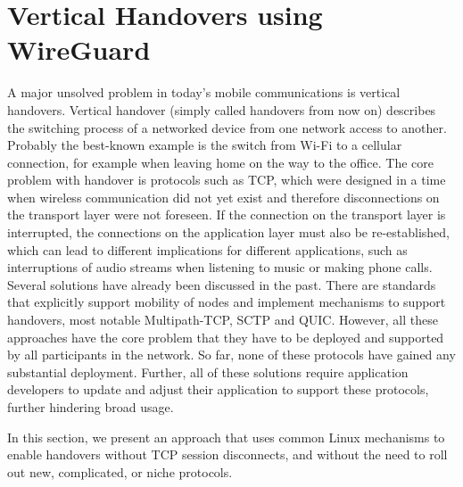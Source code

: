 \newcommand{\ld}{\texttt{LD\_PRELOAD}\xspace}

\section{Vertical Handovers using WireGuard}
\label{sec:wg:impl}

A major unsolved problem in today's mobile communications is vertical handovers.
Vertical handover (simply called handovers from now on) describes the switching process of a networked device from one network access to another.
Probably the best-known example is the switch from Wi-Fi to a cellular connection, for example when leaving home on the way to the office.
The core problem with handover is protocols such as TCP, which were designed in a time when wireless communication did not yet exist and therefore disconnections on the transport layer were not foreseen.
If the connection on the transport layer is interrupted, the connections on the application layer must also be re-established, which can lead to different implications for different applications, such as interruptions of audio streams when listening to music or making phone calls.
Several solutions have already been discussed in the past.
There are standards that explicitly support mobility of nodes and implement mechanisms to support handovers, most notable Multipath-TCP, SCTP and QUIC.
However, all these approaches have the core problem that they have to be deployed and supported by all participants in the network.
So far, none of these protocols have gained any substantial deployment.
Further, all of these solutions require application developers to update and adjust their application to support these protocols, further hindering broad usage.

In this section, we present an approach that uses common Linux mechanisms to enable handovers without TCP session disconnects, and without the need to roll out new, complicated, or niche protocols.





